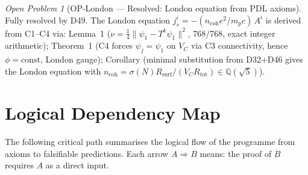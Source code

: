 \documentclass[11pt,a4paper]{article}
\theoremstyle{plain}
\theoremstyle{definition}
\theoremstyle{remark}
\newtheorem{openproblem}[theorem]{Open Problem}
\newcommand{\Rsurf}{R_{\mathrm{surf}}}
\newcommand{\Rtot}{R_{\mathrm{tot}}}
\begin{document}
\begin{openproblem}[OP-London --- Resolved: London equation from PDL axioms]
\label{op:London}
\textcolor{proofblue}{Fully resolved by D49.} The London equation $j^i_s = -(n_{\mathrm{coh}} e^2/m_p c)\,A^i$ is derived from C1--C4 via: Lemma~1 ($\nu = \tfrac{1}{4}\|\psi_1 - T^k\psi_1\|^2$, 768/768, exact integer arithmetic); Theorem~1 (C4 forces $\psi_j = \psi_1$ on $V_C$ via C3 connectivity, hence $\phi = \mathrm{const}$, London gauge); Corollary (minimal substitution from D32+D46 gives the London equation with $n_{\mathrm{coh}} = \sigma(N)\Rsurf/(V_C\Rtot) \in \mathbb{Q}(\sqrt{5})$).
\end{openproblem}

\clearpage

\section{Logical Dependency Map}
\label{sec:dependency}

The following critical path summarises the logical flow of the programme from axioms to falsifiable predictions. Each arrow $A\Rightarrow B$ means: the proof of $B$ requires $A$ as a direct input.
\end{document}
